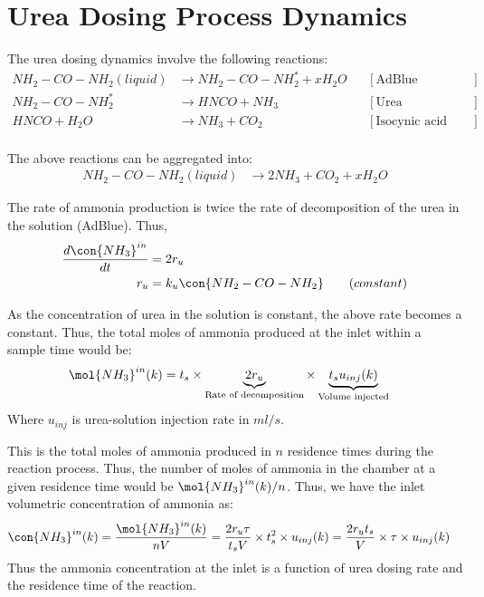\newpage
\section{Urea Dosing Process Dynamics}
The urea dosing dynamics involve the following reactions:
\begin{align*}
    NH_2 - CO - NH_2 (liquid) &\longrightarrow NH_2 - CO - NH_2^* + x H_2 O
                & &[\text{AdBlue evaporation}] \\
    NH_2 - CO - NH_2^*  &\longrightarrow  HNCO + NH_3
                & &[\text{Urea decomposition}] \\
    HNCO + H_2O &\longrightarrow NH_3 + CO_2
                & &[\text{Isocynic acid hydrolysis}] \\
\end{align*}

The above reactions can be aggregated into:
\begin{align*}
    NH_2 - CO - NH_2 (liquid) &\longrightarrow 2 NH_3 + CO_2 + x H_2 O
\end{align*}

The rate of ammonia production is twice the rate of decomposition of the urea in the solution (AdBlue). Thus,
\begin{align*}
    \frac{d \con{NH_3}^{in}}{dt} &= 2 r_{u}\\
    r_{u} &= k_{u} \con{NH_2 - CO - NH_2} \qquad (constant)
\end{align*}

As the concentration of urea in the solution is constant, the above rate becomes a constant. Thus, the total moles of
ammonia produced at the inlet within a sample time would be:
\begin{align*}
    \mol{NH_3}^{in} (k) &= t_s \times \underbrace{2 r_{u}}_{\text{Rate of decomposition}} \times \underbrace{t_s u_{inj} (k)}_{\text{Volume injected}}
\end{align*}
Where $u_{inj}$ is urea-solution injection rate in $ml/s$.

This is the total moles of ammonia produced in $n$ residence times during the reaction process. Thus, the number of moles of ammonia in the chamber at a given residence time would be $\mol{NH_3}^{in}(k)/n$.
Thus, we have the inlet volumetric concentration of ammonia as:
\begin{align*}
    \con{NH_3}^{in} (k) &= \frac{\mol{NH_3}^{in} (k)}{nV}
                          = \frac{2 r_u \tau}{t_s V} \times t_s^2 \times u_{inj} (k)
                          = \frac{2 r_u t_s}{V} \times \tau \times u_{inj} (k)
\end{align*}
Thus the ammonia concentration at the inlet is a function of urea dosing rate and the residence time of the reaction.

